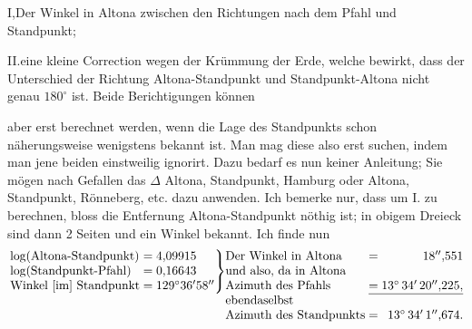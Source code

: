 \noindent
\begin{minipage}[t]{.26\linewidth}
 \vspace{0pt}
 \centering
\end{minipage}\hfill
\begin{minipage}[t]{.71\linewidth}
 \vspace{0pt}
 \setlength{\parindent}{1.5em}
 \indent I,\quad Der Winkel in Altona zwischen den Richtungen nach dem Pfahl und Standpunkt;

 II.\quad eine kleine Correction wegen der Krümmung der Erde, welche bewirkt, dass der Unterschied der Richtung Altona-Standpunkt und Standpunkt-Altona nicht genau \(180^\circ\) ist. Beide Berichtigungen können
\end{minipage}\par
\noindent aber erst berechnet werden, wenn die Lage des Standpunkts schon näherungsweise wenigstens bekannt ist. Man mag diese also erst suchen, indem man jene beiden einstweilig ignorirt. Dazu bedarf es nun keiner Anleitung; Sie mögen nach Gefallen das \(\Delta\) Altona, Standpunkt, Hamburg oder Altona, Standpunkt, Rönneberg, etc. dazu anwenden. Ich bemerke nur, dass um I. zu berechnen, bloss die Entfernung Altona-Standpunkt nöthig ist; in obigem Dreieck sind dann 2 Seiten und ein Winkel bekannt. Ich finde nun
\[
\raisebox{\baselineskip}{\(\displaystyle
\left.
\begin{array}{@{}l@{\;=\;}l@{}}
 \log(\text{Altona-Standpunkt})&4{,}09915\\
 \log(\text{Standpunkt-Pfahl})&0{,}16643\\
 \text{Winkel [im] Standpunkt}&129^\circ36'58''
\end{array}\right\}
\)}
\begin{array}{@{}l@{\;}c@{\;}r@{}}
 \text{Der Winkel in Altona}&=&18''{,}551\\
 \text{und also, da in Altona}&&\\
 \text{Azimuth des Pfahls}&=&13^\circ\,34'\,20''{,}225,\\
 \cline{2-3}
 \text{ebendaselbst}&&\\
 \text{Azimuth des Standpunkts}&=&13^\circ\,34'\,1''{,}674.
\end{array}
\]

